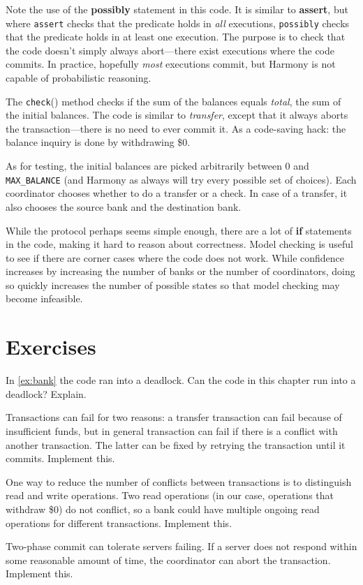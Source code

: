 \documentclass{report}
\begin{document}
Note the use of the \textbf{possibly} statement in this code.
It is similar to \textbf{assert}, but where \texttt{assert} checks that
the predicate holds in \emph{all} executions, \texttt{possibly} checks
that the predicate holds in at least one execution.
The purpose is to check that the code doesn't simply always abort---there
exist executions where the code commits.
In practice, hopefully \emph{most} executions commit, but Harmony is not
capable of probabilistic reasoning.

The \texttt{check}() method checks if the sum of the balances equals
\textit{total}, the sum of the initial balances.
The code is similar to \textit{transfer}, except that it always
aborts the transaction---there is no need to ever commit it.
As a code-saving hack: the balance inquiry is done by withdrawing \$0.

As for testing, the initial balances are picked arbitrarily between
0 and \texttt{MAX\_BALANCE} (and Harmony as always will try every
possible set of choices).
Each coordinator chooses whether to do a transfer or a check.  In
case of a transfer, it also chooses the source bank and the destination
bank.

While the protocol perhaps seems simple enough, there are a lot of
\textbf{if} statements in the code, making it hard to reason about
correctness.
Model checking is useful to see if there are corner
cases where the code does not work.
While confidence increases by
increasing the number of banks or the number of coordinators, doing so
quickly increases the number of possible states so that model checking
may become infeasible.

\section*{Exercises}
\begin{problems}
\item In \autoref{ex:bank} the code ran into a deadlock.  Can the code
in this chapter run into a deadlock?  Explain.
\item Transactions can fail for two reasons: a transfer transaction can
fail because of insufficient funds, but in general transaction can fail
if there is a conflict with another transaction.  The latter can be
fixed by retrying the transaction until it commits.  Implement this.
\item One way to reduce the number of conflicts between transactions
is to distinguish read and write operations.  Two read operations
(in our case, operations that withdraw \$0) do not conflict,
so a bank could have multiple ongoing read operations
for different transactions.  Implement this.
\item Two-phase commit can tolerate servers failing.  If a server does not
respond within some reasonable amount of time, the coordinator can abort
the transaction.  Implement this.
\end{problems}
\end{document}
